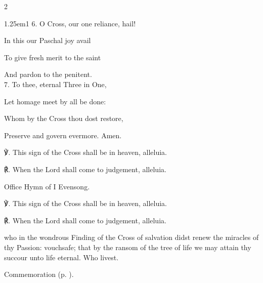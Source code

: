 \begin{paracol}{2}
\begin{hangparas}{1.25em}{1}
6. O Cross, our one reliance, hail!

In this our Paschal joy avail

To give fresh merit to the saint

And pardon to the penitent.\\

7. To thee, eternal Three in One,

Let homage meet by all be done:

Whom by the Cross thou dost restore,

Preserve and govern evermore. Amen.\\
\end{hangparas}

℣. This sign of the Cross shall be in heaven, alleluia.

℟. When the Lord shall come to judgement, alleluia.



\secondEvensong
{}

\begin{rubric}
	Office Hymn of I Evensong.
\end{rubric}

℣. This sign of the Cross shall be in heaven, alleluia.

℟. When the Lord shall come to judgement, alleluia.



\collect
{} who in the wondrous Finding of the Cross of salvation didst renew the miracles of thy Passion: vouchsafe; that by the ransom of the tree of life we may attain thy succour unto life eternal. Who livest.
\begin{rubric}
	 Commemoration  (p. \pageref{AlexanderEtcCollect}).
\end{rubric}


\switchcolumn


\end{paracol}
